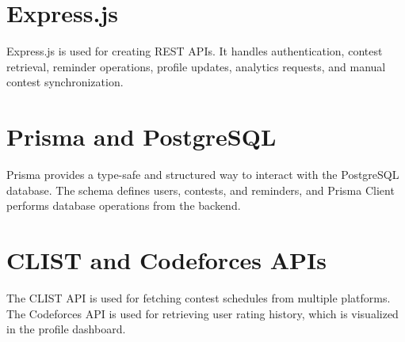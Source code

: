 \documentclass[12pt,a4paper]{report}
\begin{document}
\begin{normalsize}
\section{Express.js}

Express.js is used for creating REST APIs. It handles authentication, contest retrieval, reminder operations, profile updates, analytics requests, and manual contest synchronization.

\section{Prisma and PostgreSQL}

Prisma provides a type-safe and structured way to interact with the PostgreSQL database. The schema defines users, contests, and reminders, and Prisma Client performs database operations from the backend.

\section{CLIST and Codeforces APIs}

The CLIST API is used for fetching contest schedules from multiple platforms. The Codeforces API is used for retrieving user rating history, which is visualized in the profile dashboard.

\end{normalsize}
\end{document}
